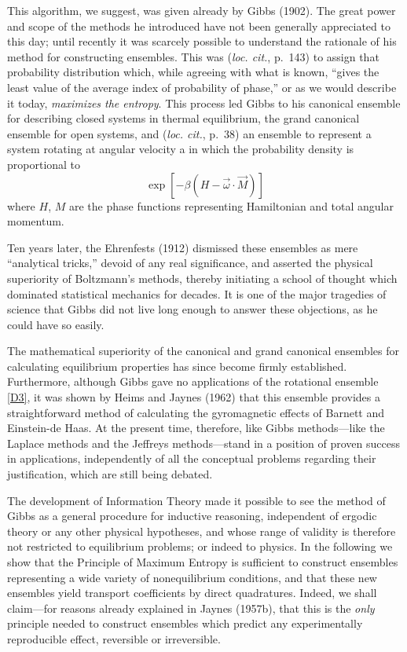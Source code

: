 This algorithm, we suggest, was given already by \cite{gibbs}{Gibbs (1902)}.
The great power and scope of the methods he introduced have not been generally appreciated to this day; until recently it was scarcely possible to understand the rationale of his method for constructing ensembles.
This was (\emph{loc. cit.}, p.~143) to assign that probability distribution which, while agreeing with what is known, ``gives the least value of the average index of probability of phase,'' or as we would describe it today, \emph{maximizes the entropy}.
This process led Gibbs to his canonical ensemble for describing closed systems in thermal equilibrium, the grand canonical ensemble for open systems, and (\emph{loc. cit.}, p.~38) an ensemble to represent a system rotating at angular velocity a in which the probability density is proportional to
\begin{equation}
	\label{D3}
	\exp[-\beta(H-\vec{\omega}\cdot\vec{M})]
\end{equation}
where $H$, $M$ are the phase functions representing Hamiltonian and total angular momentum.

Ten years later, the \cite{ehrenfest}{Ehrenfests (1912)} dismissed these ensembles as mere ``analytical tricks,'' devoid of any real significance, and asserted the physical superiority of Boltzmann's methods, thereby initiating a school of thought which dominated statistical mechanics for decades.
It is one of the major tragedies of science that Gibbs did not live long enough to answer these objections, as he could have so easily.

The mathematical superiority of the canonical and grand canonical ensembles for calculating equilibrium properties has since become firmly established.
Furthermore, although Gibbs gave no applications of the rotational ensemble \eqref{D3}, it was shown by \cite{heims}{Heims and Jaynes (1962)} that this ensemble provides a straightforward method of calculating the gyromagnetic effects of Barnett and Einstein-de Haas.
At the present time, therefore, like Gibbs methods---like the Laplace methods and the Jeffreys methods---stand in a position of proven success in applications, independently of all the conceptual problems regarding their justification, which are still being debated.

The development of Information Theory made it possible to see the method of Gibbs as a general procedure for inductive reasoning, independent of ergodic theory or any other physical hypotheses, and whose range of validity is therefore not restricted to equilibrium problems; or indeed to physics.
In the following we show that the Principle of Maximum Entropy is sufficient to construct ensembles representing a wide variety of nonequilibrium conditions, and that these new ensembles yield transport coefficients by direct quadratures.
Indeed, we shall claim---for reasons already explained in \cite{jaynes57}{Jaynes (1957b)}, that this is the \emph{only} principle needed to construct ensembles which predict any experimentally reproducible effect, reversible or irreversible.


